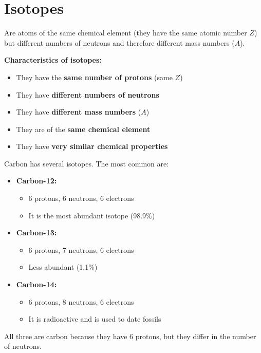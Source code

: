 \section{Isotopes}
\begin{definition}[isotopes]
    Are atoms of the same chemical element (they have the same atomic number \( Z \)) but different numbers of neutrons and therefore different mass numbers (\( A \)).
\end{definition}
\textbf{Characteristics of isotopes:}
\begin{itemize}
    \item They have the \textbf{same number of protons} (same \( Z \))
    \item They have \textbf{different numbers of neutrons}
    \item They have \textbf{different mass numbers} (\( A \))
    \item They are of the \textbf{same chemical element}
    \item They have \textbf{very similar chemical properties}
\end{itemize}
\begin{example}
    Carbon has several isotopes. The most common are:
    \begin{itemize}
        \item \textbf{Carbon-12:} 
        \begin{itemize}
            \item 6 protons, 6 neutrons, 6 electrons
            \item It is the most abundant isotope (98.9\%)
        \end{itemize}

        \item \textbf{Carbon-13:} 
        \begin{itemize}
            \item 6 protons, 7 neutrons, 6 electrons
            \item Less abundant (1.1\%)
        \end{itemize}
        \item \textbf{Carbon-14:} 
        \begin{itemize}
            \item 6 protons, 8 neutrons, 6 electrons
            \item It is radioactive and is used to date fossils
        \end{itemize}
    \end{itemize}
    All three are carbon because they have 6 protons, but they differ in the number of neutrons.
\end{example}

